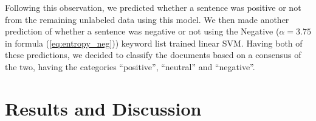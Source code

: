 \documentclass[review]{elsarticle}
\begin{document}
\begin{table}[h] \centering
\caption{Results of the K-fold Cross Validation performance tests \protect\footnotemark}\label{tab:svm_f1}
\end{table}



Following this observation, we predicted whether a sentence was positive or not from the remaining unlabeled data using this model. We then made another prediction of whether a sentence was negative or not using the Negative (\(\alpha = 3.75\) in formula (\ref{eq:entropy_neg})) keyword list trained linear SVM. Having both of these predictions, we decided to classify the documents based on a consensus of the two, having the categories “positive”, “neutral” and “negative”.

\section{Results and Discussion}\label{results_discussion}
\end{document}

